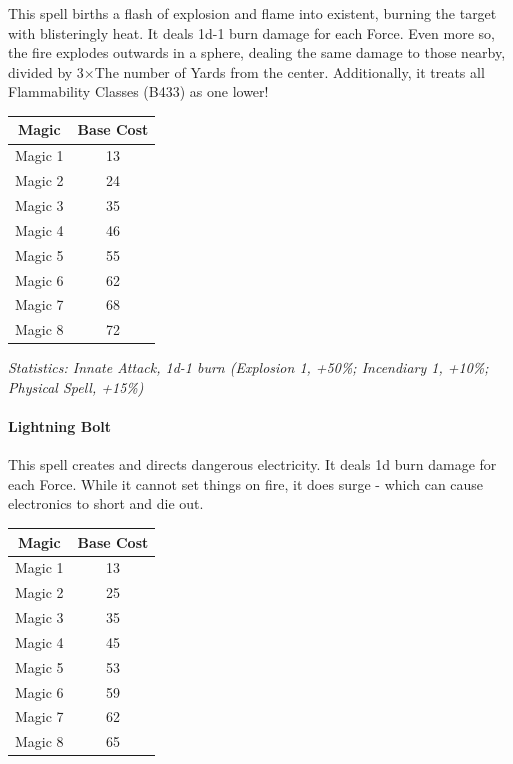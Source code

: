 \begin{multicols*}{3}
	This spell births a flash of explosion and flame into existent, burning the target with blisteringly heat. It deals 1d-1 burn damage for each Force. Even more so, the fire explodes outwards in a sphere, dealing the same damage to those nearby, divided by 3\(\times\)The number of Yards from the center. Additionally, it treats all Flammability Classes (B433) as one lower! 
	
	\begin{center}
		\begin{tabular}{|c|c|}
			\hline
			Magic & Base Cost \\
			\hline
			\hline
			Magic 1 & 13 \\
			Magic 2 & 24 \\
			Magic 3 & 35 \\
			Magic 4 & 46 \\
			Magic 5 & 55 \\
			Magic 6 & 62 \\
			Magic 7 & 68 \\
			Magic 8 & 72 \\
			\hline
		\end{tabular}
	\end{center}
	
	\textcolor{OliveGreen}{\textit{Statistics: Innate Attack, 1d-1 burn (Explosion 1, +50\%; Incendiary 1, +10\%; Physical Spell, +15\%)}}
	
	\paragraph{Lightning Bolt}
	
	This spell creates and directs dangerous electricity. It deals 1d burn damage for each Force. While it cannot set things on fire, it does surge - which can cause electronics to short and die out.
	
	\begin{center}
		\begin{tabular}{|c|c|}
			\hline
			Magic & Base Cost \\
			\hline
			\hline
			Magic 1 & 13 \\
			Magic 2 & 25 \\
			Magic 3 & 35 \\
			Magic 4 & 45 \\
			Magic 5 & 53 \\
			Magic 6 & 59 \\
			Magic 7 & 62 \\
			Magic 8 & 65 \\
			\hline
		\end{tabular}
	\end{center}
	

\end{multicols*}
